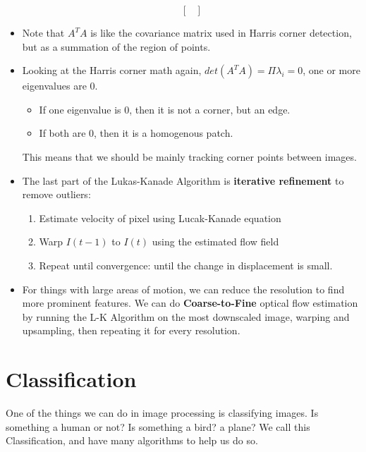 \documentclass{article}
\begin{document}
\begin{itemize}
$$\begin{bmatrix}
    \end{bmatrix}$$
    \item Note that $A^TA$ is like the covariance matrix used in Harris corner detection, but as a summation of the region of points. 
    \item Looking at the Harris corner math again, $det(A^TA) = \Pi\lambda_i = 0$, one or more eigenvalues are 0. 
    \begin{itemize}
        \item If one eigenvalue is 0, then it is not a corner, but an edge.
        \item If both are 0, then it is a homogenous patch. 
    \end{itemize} This means that we should be mainly tracking corner points between images.
    \item The last part of the Lukas-Kanade Algorithm is \textbf{iterative refinement} to remove outliers:
    \begin{enumerate}
        \item Estimate velocity of pixel using Lucak-Kanade equation
        \item Warp $I(t-1)$ to $I(t)$ using the estimated flow field
        \item Repeat until convergence: until the change in displacement is small.
    \end{enumerate}
    \item For things with large areas of motion, we can reduce the resolution to find more prominent features. We can do \textbf{Coarse-to-Fine} optical flow estimation by running the L-K Algorithm on the most downscaled image, warping and upsampling, then repeating it for every resolution. 
\end{itemize}
\section{Classification}
One of the things we can do in image processing is classifying images. Is something a human or not? Is something a bird? a plane? We call this Classification, and have many algorithms to help us do so.
\end{document}
